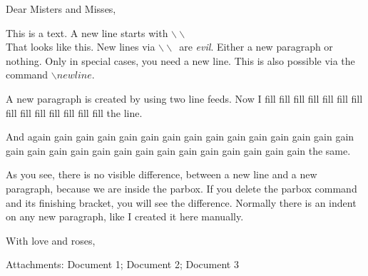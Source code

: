 \documentclass[12pt,a4paper]{scrlttr2}
\begin{document}
\begin{letter}{}

\firsthead{} %
\firstfoot{} %
\pagestyle{empty} %

\parbox{\textwidth}{ %
\opening{Dear Misters and Misses,}

This is a text. A new line starts with $\backslash \backslash$ ~ \\%
That looks like this. New lines via $\backslash \backslash$~are \emph{evil}. Either a new paragraph or nothing. Only in special cases, you need a new line. This is also possible via the command $\backslash newline$.

A new paragraph is created by using two line feeds. Now I fill fill fill fill fill fill fill fill fill fill fill fill fill fill the line.

And again gain gain gain gain gain gain gain gain gain gain gain gain gain gain gain gain gain gain gain gain gain gain gain gain gain gain gain gain the same.

\hspace{15pt} As you see, there is no visible difference, between a new line and a new paragraph, because we are inside the parbox. If you delete the parbox command and its finishing bracket, you will see the difference. Normally there is an indent on any new paragraph, like I created it here manually.

\closing{With love and roses,}

} %

\vfill %
\parbox{\textwidth}{Attachments: Document 1; Document 2; Document 3}

\end{letter}
\end{document}
